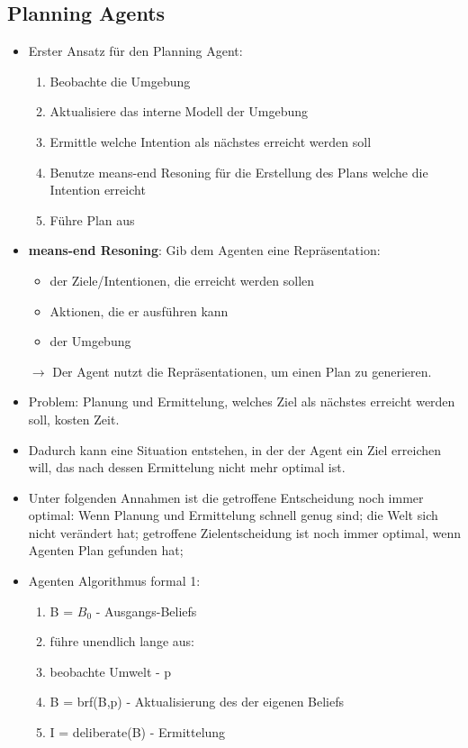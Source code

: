 \documentclass{article} %
\begin{document}
	\subsection{Planning Agents}
	\begin{itemize}
		\item Erster Ansatz für den Planning Agent:
		\begin{enumerate}
			\item Beobachte die Umgebung
			\item Aktualisiere das interne Modell der Umgebung
			\item Ermittle welche Intention als nächstes erreicht werden soll
			\item Benutze means-end Resoning für die Erstellung des Plans welche die Intention erreicht
			\item Führe Plan aus
		\end{enumerate}
		\item \textbf{means-end Resoning}: Gib dem Agenten eine Repräsentation:
			\begin{itemize}
			\item der Ziele/Intentionen, die erreicht werden sollen
			\item Aktionen, die er ausführen kann
			\item der Umgebung 
			\end{itemize}
		 $\rightarrow$ Der Agent nutzt die Repräsentationen, um einen Plan zu generieren.
		\item Problem: Planung und Ermittelung, welches Ziel als nächstes erreicht werden soll, kosten Zeit.
		\item Dadurch kann eine Situation entstehen, in der der Agent ein Ziel erreichen will, das nach dessen Ermittelung nicht mehr optimal ist.
		\item Unter folgenden Annahmen ist die getroffene Entscheidung noch immer optimal: Wenn Planung und  Ermittelung schnell genug sind; die Welt sich nicht verändert hat; getroffene Zielentscheidung ist noch immer optimal, wenn Agenten Plan gefunden hat;
		\item Agenten Algorithmus formal 1:
		\begin{enumerate}
			\item B = $B_{0}$ - Ausgangs-Beliefs
			\item führe unendlich lange aus:
			\item beobachte Umwelt - p
			\item B = brf(B,p) - Aktualisierung des der eigenen Beliefs
			\item I = deliberate(B) - Ermittelung

\end{enumerate}
\end{itemize}
\end{document}
